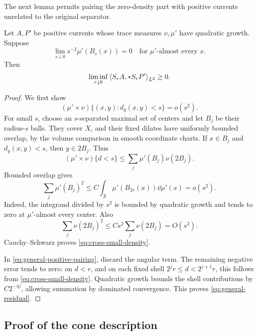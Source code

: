 The next lemma permits pairing the zero-density part with positive
currents unrelated to the original separator.

\begin{lemma}\label{lem:general-residual}
Let \(A,P'\) be positive currents whose trace measures \(\nu,\mu'\)
have quadratic growth. Suppose
\[
 \lim_{s\downarrow0}s^{-2}\mu'(B_s(x))=0
 \quad\text{for }\mu'\text{-almost every }x.
\]
Then
\begin{equation}\label{eq:general-residual}
 \liminf_{r\downarrow0}\left\langle S_rA,*S_rP'\right\rangle_{L^2}\ge0.
\end{equation}
\end{lemma}

\begin{proof}
We first show
\begin{equation}\label{eq:cross-small-density}
 (\mu'\times\nu)\{(x,y):d_g(x,y)<s\}=o(s^2).
\end{equation}
For small \(s\), choose an \(s\)-separated maximal set of centers
and let \(B_j\) be their radius-\(s\) balls. They cover \(X\),
and their fixed dilates have uniformly bounded overlap, by the
volume comparison in smooth coordinate charts. If \(x\in B_j\)
and \(d_g(x,y)<s\), then \(y\in2B_j\). Thus
\[
 (\mu'\times\nu)\{d<s\}
 \le\sum_j\mu'(B_j)\nu(2B_j).
\]
Bounded overlap gives
\[
 \sum_j\mu'(B_j)^2
 \le C\int_X\mu'(B_{2s}(x))\dd\mu'(x)=o(s^2).
\]
Indeed, the integrand divided by \(s^2\) is bounded by quadratic
growth and tends to zero at \(\mu'\)-almost every center.
Also
\[
 \sum_j\nu(2B_j)^2
 \le Cs^2\sum_j\nu(2B_j)=O(s^2).
\]
Cauchy--Schwarz proves \eqref{eq:cross-small-density}.

In \eqref{eq:general-positive-pairing}, discard the angular term.
The remaining negative error tends to zero: on \(d<r\), and on
each fixed shell \(2^jr\le d<2^{j+1}r\), this follows from
\eqref{eq:cross-small-density}. Quadratic growth bounds the shell
contributions by \(C2^{-4j}\), allowing summation by dominated
convergence. This proves \eqref{eq:general-residual}.
\end{proof}

\subsection{Proof of the cone description}

